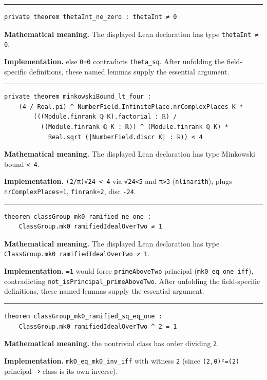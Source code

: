 \documentclass[UTF8,a4paper,11pt,fontset=fandol]{ctexart}
\theoremstyle{definition}
\newcommand{\statementsep}{\par\medskip\hrule\medskip}
\begin{document}
\statementsep
\begin{verbatim}
private theorem thetaInt_ne_zero : thetaInt ≠ 0
\end{verbatim}
\noindent\textbf{Mathematical meaning.} The displayed Lean declaration has type \texttt{thetaInt ≠ 0}.\par
\noindent\textbf{Implementation.} else \texttt{θ=0} contradicts \texttt{theta\_\allowbreak{}sq}. After unfolding the field-specific definitions, these named lemmas supply the essential argument.\par
\statementsep
\begin{verbatim}
private theorem minkowskiBound_lt_four :
    (4 / Real.pi) ^ NumberField.InfinitePlace.nrComplexPlaces K *
        (((Module.finrank ℚ K).factorial : ℝ) /
          ((Module.finrank ℚ K : ℝ)) ^ (Module.finrank ℚ K) *
            Real.sqrt (|NumberField.discr K| : ℝ)) < 4
\end{verbatim}
\noindent\textbf{Mathematical meaning.} The displayed Lean declaration has type Minkowski bound \texttt{< 4}.\par
\noindent\textbf{Implementation.} \texttt{(2/\allowbreak{}π)√24 < 4} via \texttt{√24<5} and \texttt{π>3} (\texttt{nlinarith}); plugs \texttt{nrComplexPlaces=1}, \texttt{finrank=2}, disc \texttt{-24}.\par
\statementsep
\begin{verbatim}
theorem classGroup_mk0_ramified_ne_one :
    ClassGroup.mk0 ramifiedIdealOverTwo ≠ 1
\end{verbatim}
\noindent\textbf{Mathematical meaning.} The displayed Lean declaration has type \texttt{ClassGroup.\allowbreak{}mk0 ramifiedIdealOverTwo ≠ 1}.\par
\noindent\textbf{Implementation.} \texttt{=1} would force \texttt{primeAboveTwo} principal (\texttt{mk0\_\allowbreak{}eq\_\allowbreak{}one\_\allowbreak{}iff}), contradicting \texttt{not\_\allowbreak{}isPrincipal\_\allowbreak{}primeAboveTwo}. After unfolding the field-specific definitions, these named lemmas supply the essential argument.\par
\statementsep
\begin{verbatim}
theorem classGroup_mk0_ramified_sq_eq_one :
    ClassGroup.mk0 ramifiedIdealOverTwo ^ 2 = 1
\end{verbatim}
\noindent\textbf{Mathematical meaning.} the nontrivial class has order dividing \texttt{2}.\par
\noindent\textbf{Implementation.} \texttt{mk0\_\allowbreak{}eq\_\allowbreak{}mk0\_\allowbreak{}inv\_\allowbreak{}iff} with witness \texttt{2} (since \texttt{(2,θ)²=(2)} principal ⇒ class is its own inverse).\par
\end{document}
